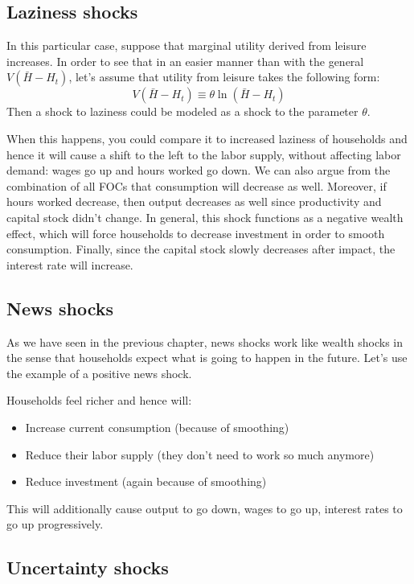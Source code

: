 \documentclass[12pt]{report}
\begin{document}
\subsection{Laziness shocks}

In this particular case, suppose that marginal utility derived from leisure increases. In order to see that in an easier manner than with the general $V(\bar H - H_t)$, let's assume that utility from leisure takes the following form: $$V(\bar H - H_t)\equiv \theta\ln(\bar H - H_t) $$ Then a shock to laziness could be modeled as a shock to the parameter $\theta$.

When this happens, you could compare it to increased laziness of households and hence it will cause a shift to the left to the labor supply, without affecting labor demand: wages go up and hours worked go down. We can also argue from the combination of all FOCs that consumption will decrease as well. Moreover, if hours worked decrease, then output decreases as well since productivity and capital stock didn't change. In general, this shock functions as a negative wealth effect, which will force households to decrease investment in order to smooth consumption. Finally, since the capital stock slowly decreases after impact, the interest rate will increase.

\subsection{News shocks}

As we have seen in the previous chapter, news shocks work like wealth shocks in the sense that households expect what is going to happen in the future. Let's use the example of a positive news shock.

Households feel richer and hence will:\begin{itemize}
\item Increase current consumption (because of smoothing)
\item Reduce their labor supply (they don't need to work so much anymore)
\item Reduce investment (again because of smoothing)
\end{itemize}
This will additionally cause output to go down, wages to go up, interest rates to go up progressively.

\subsection{Uncertainty shocks}
\end{document}
